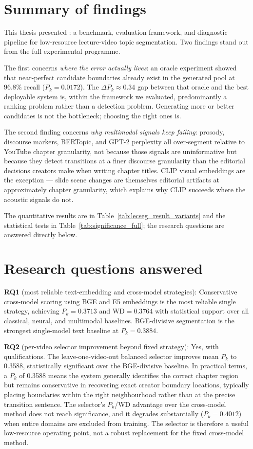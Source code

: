 \section{Summary of findings}

This thesis presented \lecseg{}: a benchmark, evaluation framework, and
diagnostic pipeline for low-resource lecture-video topic segmentation.
Two findings stand out from the full experimental programme.

The first concerns \emph{where the error actually lives}: an oracle experiment
showed that near-perfect candidate boundaries already exist in the generated
pool at 96.8\% recall ($P_k=0.0172$). The $\Delta P_k \approx 0.34$ gap between
that oracle and the best deployable system is, within the framework we evaluated,
predominantly a ranking problem rather than a detection problem. Generating
more or better candidates is not the bottleneck; choosing the right ones is.

The second finding concerns \emph{why multimodal signals keep failing}: prosody,
discourse markers, BERTopic, and GPT-2 perplexity all over-segment relative to
YouTube chapter granularity, not because those signals are uninformative but
because they detect transitions at a finer discourse granularity than the
editorial decisions creators make when writing chapter titles. CLIP visual
embeddings are the exception --- slide scene changes are themselves editorial
artifacts at approximately chapter granularity, which explains why CLIP succeeds
where the acoustic signals do not.

The quantitative results are in Table~\ref{tab:lecseg_result_variants} and
the statistical tests in Table~\ref{tab:significance_full}; the research
questions are answered directly below.

\section{Research questions answered}
\label{sec:rqs_answered}

\textbf{RQ1} (most reliable text-embedding and cross-model strategies):
Conservative cross-model scoring using BGE and E5 embeddings is the most
reliable single strategy, achieving $P_k=0.3713$ and WD$=0.3764$ with
statistical support over all classical, neural, and multimodal baselines.
BGE-divisive segmentation is the strongest single-model text baseline
at $P_k=0.3884$.

\textbf{RQ2} (per-video selector improvement beyond fixed strategy):
Yes, with qualifications.
The leave-one-video-out balanced selector improves mean $P_k$ to 0.3588,
statistically significant over the BGE-divisive baseline.
In practical terms, a $P_k$ of 0.3588 means the system generally identifies
the correct chapter region but remains conservative in recovering exact creator
boundary locations, typically placing boundaries within the right neighbourhood
rather than at the precise transition sentence.
The selector's $P_k$/WD advantage over the cross-model method does not reach
significance, and it degrades substantially ($P_k=0.4012$) when entire domains
are excluded from training.
The selector is therefore a useful low-resource operating point, not a
robust replacement for the fixed cross-model method.

